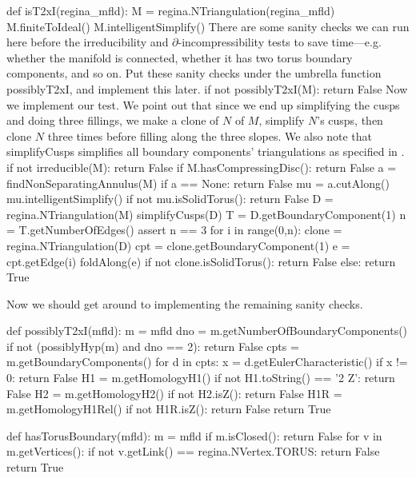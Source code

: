 \documentclass[10pt,twocolumn]{article}%
\theoremstyle{definition}
\begin{document}
def isT2xI(regina_mfld):
  M = regina.NTriangulation(regina_mfld)
  M.finiteToIdeal()
  M.intelligentSimplify()
\nwendcode{}\nwdocspar
There are some sanity checks we can run here
before the irreducibility and 
$\partial$-incompressibility tests
to save time---e.g. whether the manifold
is connected, whether it has two torus
boundary components, and so on. Put these
sanity checks under the umbrella function
{\Tt{}possiblyT2xI\nwendquote}, and implement this later.
\nwenddocs{}\plusendmoddef\nwstartdeflinemarkup\nwenddeflinemarkup
  if not possiblyT2xI(M):
    return False
\nwendcode{}\nwdocspar
Now we implement our test. We point
out that since we end up simplifying
the cusps and doing three
fillings, we make a clone of $N$ of
$M$, simplify $N$'s cusps, then
clone $N$ three times before filling
along the three slopes. We also note
that {\Tt{}simplifyCusps\nwendquote} simplifies
all boundary components' triangulations
as specified in \cite{Me}.
\nwenddocs{}\plusendmoddef\nwstartdeflinemarkup\nwenddeflinemarkup
  if not irreducible(M):
    return False
  if M.hasCompressingDisc():
    return False
  a = findNonSeparatingAnnulus(M)
  if a == None:
    return False
  mu = a.cutAlong()
  mu.intelligentSimplify()
  if not mu.isSolidTorus():
    return False
  D = regina.NTriangulation(M)
  simplifyCusps(D)
  T = D.getBoundaryComponent(1)
  n = T.getNumberOfEdges()
  assert n == 3
  for i in range(0,n):
    clone = regina.NTriangulation(D)
    cpt = clone.getBoundaryComponent(1)
    e = cpt.getEdge(i)
    foldAlong(e)
    if not clone.isSolidTorus():
      return False
  else:
    return True

\nwendcode{}\nwdocspar
Now we should get around to implementing
the remaining sanity checks.

\nwenddocs{}\endmoddef\nwstartdeflinemarkup\nwenddeflinemarkup
def possiblyT2xI(mfld):
  m = mfld
  dno = m.getNumberOfBoundaryComponents()
  if not (possiblyHyp(m) and dno == 2):
    return False
  cpts = m.getBoundaryComponents()
  for d in cpts:
    x = d.getEulerCharacteristic()
    if x != 0:
      return False
  H1 = m.getHomologyH1()
  if not H1.toString() == '2 Z':
    return False
  H2 = m.getHomologyH2()
  if not H2.isZ():
    return False
  H1R = m.getHomologyH1Rel()
  if not H1R.isZ():
    return False
  return True

\nwendcode{}\endmoddef\nwstartdeflinemarkup\nwenddeflinemarkup
def hasTorusBoundary(mfld):
  m = mfld
  if m.isClosed():
    return False
  for v in m.getVertices():
    if not v.getLink() == regina.NVertex.TORUS:
      return False
  return True
\end{document}
